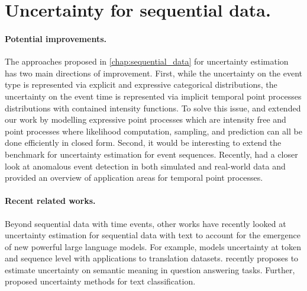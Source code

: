 
\section{Uncertainty for sequential data.}

\paragraph{Potential improvements.} The approaches proposed in \cref{chap:sequential_data} for uncertainty estimation has two main directions of improvement. First, while the uncertainty on the event type is represented via explicit and expressive categorical distributions, the uncertainty on the event time is represented via implicit temporal point processes distributions with contained intensity functions. To solve this issue, \cite{shchur2020intensity} and \cite{shchur2020fast} extended our work by modelling expressive point processes which are intensity free and point processes where likelihood computation, sampling, and prediction can all be done efficiently in closed form. Second, it would be interesting to extend the benchmark for uncertainty estimation for event sequences. Recently, \cite{shchur2021detecting} had a closer look at anomalous event detection in both simulated and real-world data and \cite{shchur2021review} provided an overview of application areas for temporal point processes. 

\paragraph{Recent related works.} Beyond sequential data with time events, other works have recently looked at uncertainty estimation for sequential data with text to account for the emergence of new powerful large language models. For example, \cite{malinin2021uncertainty} models uncertainty at token and sequence level with applications to translation datasets. \cite{kuhn2023semantic} recently proposes to estimate uncertainty on semantic meaning in question answering tasks. Further, \cite{he2020toward, hu2021uncertainty} proposed uncertainty methods for text classification.

